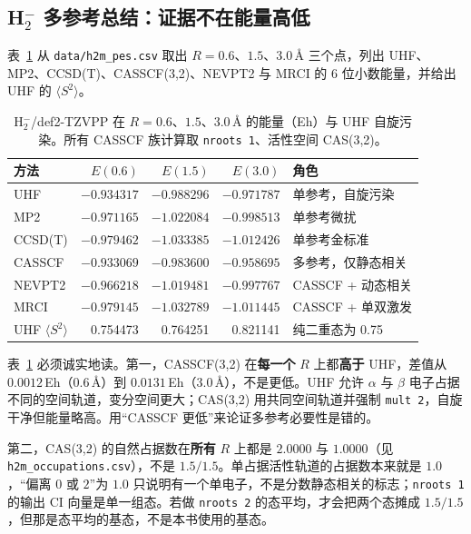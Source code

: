 \subsection{H$_2^-$ 多参考总结：证据不在能量高低}
\label{ch:16:sec:h2m}

表~\ref{ch:16:tab:h2m-summary} 从 \texttt{data/h2m\_pes.csv} 取出 $R=0.6$、$1.5$、$3.0$\,\AA{} 三个点，列出 UHF、MP2、CCSD(T)、CASSCF(3,2)、NEVPT2 与 MRCI 的 6 位小数能量，并给出 UHF 的 $\langle S^2\rangle$。

{\small
\begin{table}[t]
\centering
\caption{H$_2^-$/def2-TZVPP 在 $R=0.6$、$1.5$、$3.0$\,\AA{} 的能量（Eh）与 UHF 自旋污染。所有 CASSCF 族计算取 \texttt{nroots 1}、活性空间 CAS(3,2)。}
\label{ch:16:tab:h2m-summary}
\begin{tabular}{@{}l r r r l@{}}
\toprule
方法 & $E(0.6)$ & $E(1.5)$ & $E(3.0)$ & 角色 \\
\midrule
UHF      & $-0.934317$ & $-0.988296$ & $-0.971787$ & 单参考，自旋污染 \\
MP2      & $-0.971165$ & $-1.022084$ & $-0.998513$ & 单参考微扰 \\
CCSD(T)  & $-0.979462$ & $-1.033385$ & $-1.012426$ & 单参考金标准 \\
CASSCF   & $-0.933069$ & $-0.983600$ & $-0.958695$ & 多参考，仅静态相关 \\
NEVPT2   & $-0.966218$ & $-1.019481$ & $-0.997767$ & CASSCF + 动态相关 \\
MRCI     & $-0.979145$ & $-1.032789$ & $-1.011445$ & CASSCF + 单双激发 \\
\midrule
UHF $\langle S^2\rangle$ & 0.754473 & 0.764251 & 0.821141 & 纯二重态为 0.75 \\
\bottomrule
\end{tabular}
\end{table}
}

表~\ref{ch:16:tab:h2m-summary} 必须诚实地读。第一，CASSCF(3,2) 在\textbf{每一个} $R$ 上都\textbf{高于} UHF，差值从 $0.0012$\,Eh（$0.6$\,\AA）到 $0.0131$\,Eh（$3.0$\,\AA），不是更低。UHF 允许 $\alpha$ 与 $\beta$ 电子占据不同的空间轨道，变分空间更大；CAS(3,2) 用共同空间轨道并强制 \texttt{mult 2}，自旋干净但能量略高。用“CASSCF 更低”来论证多参考必要性是错的。

第二，CAS(3,2) 的自然占据数在\textbf{所有} $R$ 上都是 $2.0000$ 与 $1.0000$（见 \texttt{h2m\_occupations.csv}），不是 $1.5/1.5$。单占据活性轨道的占据数本来就是 $1.0$，“偏离 $0$ 或 $2$”为 $1.0$ 只说明有一个单电子，不是分数静态相关的标志；\texttt{nroots 1} 的输出 CI 向量是单一组态。若做 \texttt{nroots 2} 的态平均，才会把两个态摊成 $1.5/1.5$，但那是态平均的基态，不是本书使用的基态。

